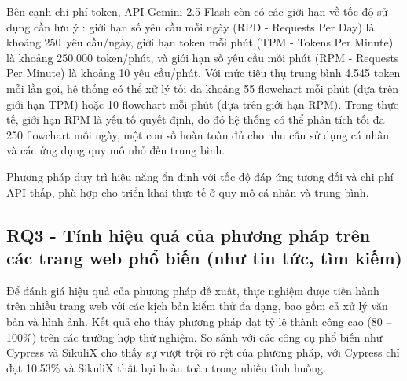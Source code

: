 \documentclass[a4paper, 12pt]{report}
\begin{document}
{Bên cạnh chi phí token, API Gemini 2.5 Flash còn có các giới hạn về tốc độ sử dụng cần lưu ý \cite{gemini_rate_limit}: giới hạn số yêu cầu mỗi ngày (RPD - Requests Per Day) là khoảng 250~yêu cầu/ngày, giới hạn token mỗi phút (TPM - Tokens Per Minute) là khoảng 250.000 token/phút, và giới hạn số yêu cầu mỗi phút (RPM - Requests Per Minute) là khoảng 10 yêu cầu/phút. Với mức tiêu thụ trung bình 4.545 token mỗi lần gọi, hệ thống có thể xử lý tối đa khoảng 55 flowchart mỗi phút (dựa trên giới hạn TPM) hoặc 10 flowchart mỗi phút (dựa trên giới hạn RPM). Trong thực tế, giới hạn RPM là yếu tố quyết định, do đó hệ thống có thể phân tích tối đa 250 flowchart mỗi ngày, một con số hoàn toàn đủ cho nhu cầu sử dụng cá nhân và các ứng dụng quy mô nhỏ đến trung bình.



\begin{tcolorbox}[
    colback=gray!10,
    colframe=gray!50!black,
    title=Trả lời cho RQ2,
    fonttitle=\bfseries,
    coltitle=white,
    colbacktitle=gray!50!black
]
Phương pháp duy trì hiệu năng ổn định với tốc độ đáp ứng tương đối và chi phí API thấp, phù hợp cho triển khai thực tế ở quy mô cá nhân và trung bình.
\end{tcolorbox}





\subsection{RQ3 - Tính hiệu quả của phương pháp trên các trang web phổ biến (như tin tức, tìm kiếm)}


Để đánh giá hiệu quả của phương pháp đề xuất, thực nghiệm được tiến hành trên nhiều trang web với các kịch bản kiểm thử đa dạng, bao gồm cả xử lý văn bản và hình ảnh. Kết quả cho thấy phương pháp đạt tỷ lệ thành công cao (80 -- 100\%) trên các trường hợp thử nghiệm. So sánh với các công cụ phổ biến như Cypress và SikuliX cho thấy sự vượt trội rõ rệt của phương pháp, với Cypress chỉ đạt 10.53\% và SikuliX thất bại hoàn toàn trong nhiều tình huống.


}
\end{document}
